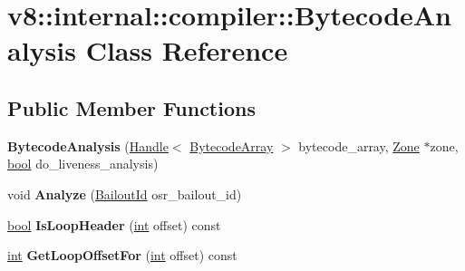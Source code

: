 \hypertarget{classv8_1_1internal_1_1compiler_1_1BytecodeAnalysis}{}\section{v8\+:\+:internal\+:\+:compiler\+:\+:Bytecode\+Analysis Class Reference}
\label{classv8_1_1internal_1_1compiler_1_1BytecodeAnalysis}
\subsection*{Public Member Functions}
\begin{DoxyCompactItemize}
\item 
\mbox{\label{classv8_1_1internal_1_1compiler_1_1BytecodeAnalysis_ae8e4252bdd6cbecb1afd0c3dc93ab9a8}} 
{\bfseries Bytecode\+Analysis} (\mbox{\hyperlink{classv8_1_1internal_1_1Handle}{Handle}}$<$ \mbox{\hyperlink{classv8_1_1internal_1_1BytecodeArray}{Bytecode\+Array}} $>$ bytecode\+\_\+array, \mbox{\hyperlink{classv8_1_1internal_1_1Zone}{Zone}} $\ast$zone, \mbox{\hyperlink{classbool}{bool}} do\+\_\+liveness\+\_\+analysis)
\item 
\mbox{\label{classv8_1_1internal_1_1compiler_1_1BytecodeAnalysis_a9d902072187281840de72654bc82413e}} 
void {\bfseries Analyze} (\mbox{\hyperlink{classv8_1_1internal_1_1BailoutId}{Bailout\+Id}} osr\+\_\+bailout\+\_\+id)
\item 
\mbox{\label{classv8_1_1internal_1_1compiler_1_1BytecodeAnalysis_ad808c62759c34def9f0061c4937c91cd}} 
\mbox{\hyperlink{classbool}{bool}} {\bfseries Is\+Loop\+Header} (\mbox{\hyperlink{classint}{int}} offset) const
\item 
\mbox{\label{classv8_1_1internal_1_1compiler_1_1BytecodeAnalysis_ac2ec9d606613da8f051d273abec35a7c}} 
\mbox{\hyperlink{classint}{int}} {\bfseries Get\+Loop\+Offset\+For} (\mbox{\hyperlink{classint}{int}} offset) const
\item 
\mbox{\label{classv8_1_1internal_1_1compiler_1_1BytecodeAnalysis_a96c982ea5fddce20f373c0e5ec604ad3}} 

\end{DoxyCompactItemize}
